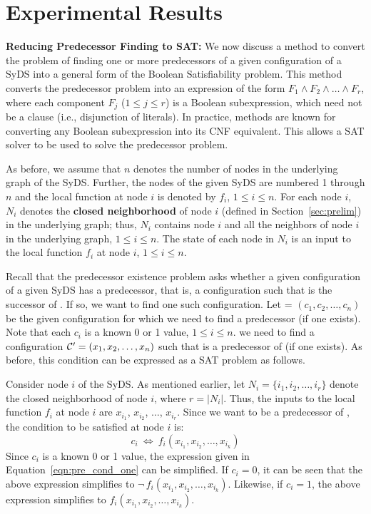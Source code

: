 \section{Experimental Results}
\label{sec:experiments}

\noindent
\textbf{Reducing Predecessor Finding to SAT:}
We now discuss  a method to convert the problem of finding one or more
predecessors of a given configuration of a SyDS into a general form 
of the Boolean Satisfiability problem. 
This method converts the predecessor 
problem into an expression of
the form $F_1 \wedge F_2 \wedge \ldots \wedge F_r$, where each
component $F_j$ ($1 \leq j \leq r$) is a Boolean subexpression,
which need not be a clause (i.e., disjunction of literals).
In practice, methods are known for converting any Boolean subexpression
into its CNF equivalent.
This allows a SAT solver 
to be used to solve the predecessor problem. 

As before,
we assume that $n$ denotes the number of nodes in the
underlying graph of the SyDS. 
Further, the nodes of the given SyDS are numbered 1 through $n$ 
and the local function at node $i$ is denoted by $f_i$,
$1 \leq i \leq n$.
For each node $i$, $N_i$ denotes the \textbf{closed neighborhood}
of node $i$ (defined in Section~\ref{sec:prelim})
in the underlying graph; thus, $N_i$ contains node $i$
and all the neighbors of node $i$ in the underlying graph, $1 \leq i \leq n$.
The state of each node in $N_i$ is an input to the
local function $f_i$ at node $i$, $1 \leq i \leq n$.

\smallskip


Recall that the predecessor existence problem asks whether a given
configuration \calc{} of a given SyDS \cals{}
has a predecessor, that is, a configuration \calcp{} such that 
\calc{} is the successor of \calcp.
If so, we want to find one such configuration.
Let \calc{} = $(c_1, c_2, \ldots, c_n)$ be
the given configuration for which we need to 
find a predecessor (if one exists).
Note that each $c_i$ is a known 0 or 1 value, $1 \leq i \leq n$.
we need to find a configuration 
$\mbox{$\mathcal{C'}$}{} = (x_1, x_2, \ldots, x_n)$ such that \calcp{}
is a predecessor of \calc{} (if one exists). 
As before, this condition can be expressed as a SAT problem as follows.

Consider node $i$ of the SyDS. 
As mentioned earlier, let $N_i = \{i_1, i_2, \ldots, i_r\}$
denote the closed neighborhood of node $i$, where $r = |N_i|$.
Thus, the inputs to the local function $f_i$ at node $i$
are $x_{i_1}$, $x_{i_2}$, $\ldots$,  $x_{i_r}$.
Since we want \calcp{} to be a predecessor of \calc, the condition to
be satisfied at node $i$ is:
\begin{equation}\label{eqn:pre_cond_one}
     c_i  ~\Leftrightarrow~ f_i(x_{i_1}, x_{i_2}, \ldots,  x_{i_k})
\end{equation}
Since $c_i$ is a known 0 or 1 value, the expression given 
in Equation~\eqref{eqn:pre_cond_one} can be simplified.
If $c_i = 0$, it can be seen that the above expression 
simplifies to $\neg\,f_i(x_{i_1}, x_{i_2}, \ldots,  x_{i_k})$.
Likewise, if $c_i = 1$, the above expression 
simplifies to $f_i(x_{i_1}, x_{i_2}, \ldots,  x_{i_k})$.

